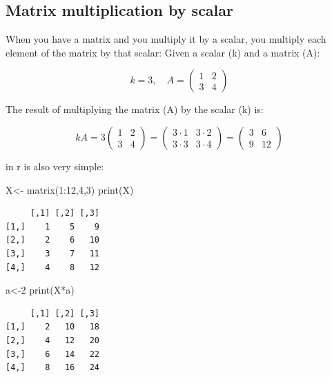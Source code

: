 \documentclass[
  letterpaper,
  DIV=11,
  numbers=noendperiod]{scrartcl}
\newenvironment{Shaded}{\begin{snugshade}}{\end{snugshade}}
\newcommand{\DecValTok}[1]{\textcolor[rgb]{0.68,0.00,0.00}{#1}}
\newcommand{\FunctionTok}[1]{\textcolor[rgb]{0.28,0.35,0.67}{#1}}
\newcommand{\NormalTok}[1]{\textcolor[rgb]{0.00,0.23,0.31}{#1}}
\newcommand{\OtherTok}[1]{\textcolor[rgb]{0.00,0.23,0.31}{#1}}
\newcommand{\SpecialCharTok}[1]{\textcolor[rgb]{0.37,0.37,0.37}{#1}}
\begin{document}
\subsection{Matrix multiplication by
scalar}\label{matrix-multiplication-by-scalar}

When you have a matrix and you multiply it by a scalar, you multiply
each element of the matrix by that scalar: Given a scalar (k) and a
matrix (A):

\[
k = 3, \quad A = \begin{pmatrix}
1 & 2 \\
3 & 4
\end{pmatrix}
\]

The result of multiplying the matrix (A) by the scalar (k) is:

\[
kA = 3 \begin{pmatrix}
1 & 2 \\
3 & 4
\end{pmatrix} = \begin{pmatrix}
3 \cdot 1 & 3 \cdot 2 \\
3 \cdot 3 & 3 \cdot 4
\end{pmatrix} = \begin{pmatrix}
3 & 6 \\
9 & 12
\end{pmatrix}
\]

in r is also very simple:

\begin{Shaded}
\begin{Highlighting}[]
\NormalTok{X}\OtherTok{\textless{}{-}} \FunctionTok{matrix}\NormalTok{(}\DecValTok{1}\SpecialCharTok{:}\DecValTok{12}\NormalTok{,}\DecValTok{4}\NormalTok{,}\DecValTok{3}\NormalTok{)}
\FunctionTok{print}\NormalTok{(X)}
\end{Highlighting}
\end{Shaded}

\begin{verbatim}
     [,1] [,2] [,3]
[1,]    1    5    9
[2,]    2    6   10
[3,]    3    7   11
[4,]    4    8   12
\end{verbatim}

\begin{Shaded}
\begin{Highlighting}[]
\NormalTok{a}\OtherTok{\textless{}{-}}\DecValTok{2}
\FunctionTok{print}\NormalTok{(X}\SpecialCharTok{*}\NormalTok{a)}
\end{Highlighting}
\end{Shaded}

\begin{verbatim}
     [,1] [,2] [,3]
[1,]    2   10   18
[2,]    4   12   20
[3,]    6   14   22
[4,]    8   16   24
\end{verbatim}
\end{document}

